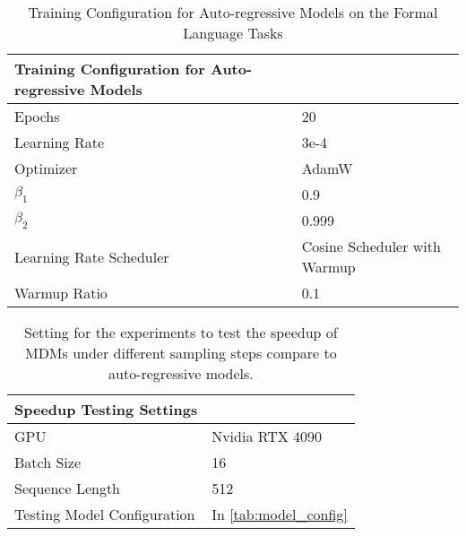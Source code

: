 \begin{table}[H]
    \centering
    \begin{tabular}{ll}
      \toprule
    {\centering \textbf{Training Configuration for Auto-regressive Models} }\\
    \midrule
        Epochs & 20\\
        Learning Rate & 3e-4 \\
        Optimizer & AdamW \\
        $\beta_1$ & 0.9 \\
        $\beta_2$ & 0.999 \\
        Learning Rate Scheduler & Cosine Scheduler with Warmup \\
        Warmup Ratio & 0.1 \\
        \bottomrule
    \end{tabular}
    \caption{Training Configuration for Auto-regressive Models on the Formal Language Tasks}
    \label{tab:training_config_AR}
\end{table}

\begin{table}[H]
    \centering
    \begin{tabular}{ll}
      \toprule
    {\centering \textbf{Speedup Testing Settings} }\\
    \midrule
        GPU & Nvidia RTX 4090\\
        Batch Size & 16 \\
        Sequence Length & 512\\
        Testing Model Configuration & In \cref{tab:model_config}\\
        \bottomrule
    \end{tabular}
    \caption{Setting for the experiments to test the speedup of MDMs under different sampling steps compare to auto-regressive models.}
    \label{tab:speed_up}
\end{table}
